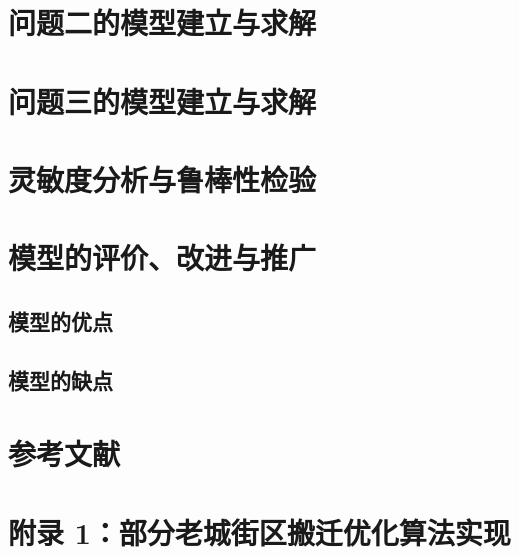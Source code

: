 \documentclass[12pt,a4paper]{ctexart}
\begin{document}
\section{问题二的模型建立与求解}
\section{问题三的模型建立与求解}
\section{灵敏度分析与鲁棒性检验}
\newpage
\section{模型的评价、改进与推广}
\subsection{模型的优点}
\subsection{模型的缺点} 

\newpage
\section*{参考文献}

\newpage
\section*{附录 1：部分老城街区搬迁优化算法实现}
\end{document}
